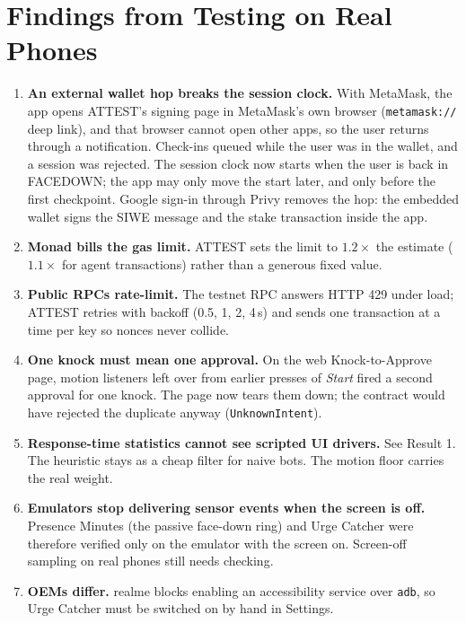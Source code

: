 \documentclass[10pt]{article}
\newcommand{\code}[1]{\texttt{\small #1}}
\begin{document}
\section{Findings from Testing on Real Phones}\label{sec:findings}
\begin{enumerate}
\item \textbf{An external wallet hop breaks the session clock.} With MetaMask, the app opens ATTEST's signing page in
MetaMask's own browser (\code{metamask://} deep link), and that browser cannot open other apps, so the user returns
through a notification. Check-ins queued while the user was in the wallet, and a session was rejected. The session clock
now starts when the user is back in FACEDOWN; the app may only move the start later, and only before the first
checkpoint. Google sign-in through Privy removes the hop: the embedded wallet signs the SIWE message and the stake
transaction inside the app.
\item \textbf{Monad bills the gas limit.} ATTEST sets the limit to $1.2\times$ the estimate ($1.1\times$ for agent
transactions) rather than a generous fixed value.
\item \textbf{Public RPCs rate-limit.} The testnet RPC answers HTTP 429 under load; ATTEST retries with backoff (0.5, 1,
2, 4\,s) and sends one transaction at a time per key so nonces never collide.
\item \textbf{One knock must mean one approval.} On the web Knock-to-Approve page, motion listeners left over from
earlier presses of \emph{Start} fired a second approval for one knock. The page now tears them down; the contract would
have rejected the duplicate anyway (\code{UnknownIntent}).
\item \textbf{Response-time statistics cannot see scripted UI drivers.} See Result 1. The heuristic stays as a cheap
filter for naive bots. The motion floor carries the real weight.
\item \textbf{Emulators stop delivering sensor events when the screen is off.} Presence Minutes (the passive face-down
ring) and Urge Catcher were therefore verified only on the emulator with the screen on. Screen-off sampling on real
phones still needs checking.
\item \textbf{OEMs differ.} realme blocks enabling an accessibility service over \code{adb}, so Urge Catcher must be
switched on by hand in Settings.
\end{enumerate}
\end{document}

